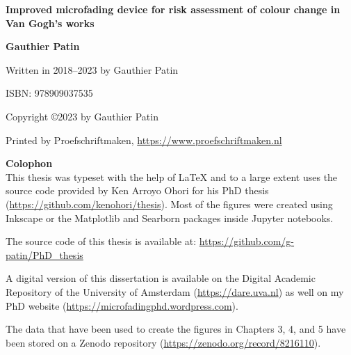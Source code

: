 



\begin{titlepage}
   \begin{center}
       \vspace*{4cm}

       \textbf{\Huge Improved microfading device for risk assessment of colour change in Van Gogh's works}
           
       \vspace{7cm}
       
       \textbf{\Large Gauthier Patin}          
              
   \end{center}
\end{titlepage}



\null%
\label{thesis:colophon}
\vfill
{}

Written in 2018--2023 by Gauthier Patin 

ISBN: 978909037535

Copyright \copyright \hspace{0.1cm}2023 by Gauthier Patin

Printed by Proefschriftmaken, \url{https://www.proefschriftmaken.nl}\\

\vspace{0.5cm}

\textbf{Colophon} \\

This thesis was typeset with the help of \LaTeX{} and to a large extent uses the source code provided by Ken Arroyo Ohori for his PhD thesis (\url{https://github.com/kenohori/thesis}). Most of the figures were created using Inkscape or the Matplotlib and Searborn packages inside Jupyter notebooks.

The source code of this thesis is available at: \url{https://github.com/g-patin/PhD_thesis}

A digital version of this dissertation is available on the Digital Academic Repository of the University of Amsterdam (\url{https://dare.uva.nl}) as well on my PhD website (\url{https://microfadingphd.wordpress.com}). 

The data that have been used to create the figures in Chapters 3, 4, and 5 have been stored on a Zenodo repository (\url{https://zenodo.org/record/8216110}). \\

